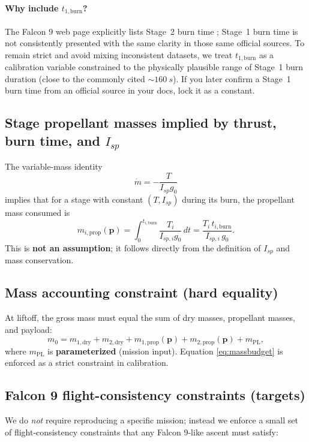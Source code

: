 \documentclass[11pt]{article}
\begin{document}
\paragraph{Why include $t_{1,\text{burn}}$?}
The Falcon 9 web page explicitly lists Stage~2 burn time \cite{SpaceX_F9_Web}; Stage~1 burn time is not consistently presented with the same clarity in those same official sources. To remain strict and avoid mixing inconsistent datasets, we treat $t_{1,\text{burn}}$ as a calibration variable constrained to the physically plausible range of Stage~1 burn duration (close to the commonly cited $\sim\SI{160}{s}$). If you later confirm a Stage~1 burn time from an official source in your docs, lock it as a constant.

\subsection{Stage propellant masses implied by thrust, burn time, and $I_{sp}$}
The variable-mass identity
\[
\dot m=-\frac{T}{I_{sp}g_0}
\]
implies that for a stage with constant $(T,I_{sp})$ during its burn, the propellant mass consumed is
\begin{equation}\label{eq:mprop}
m_{i,\text{prop}}( \bm{p} )=\int_0^{t_{i,\text{burn}}}\!\!\frac{T_i}{I_{sp,i}g_0}\,dt
=\frac{T_i\,t_{i,\text{burn}}}{I_{sp,i}\,g_0}.
\end{equation}
This is \textbf{not an assumption}; it follows directly from the definition of $I_{sp}$ and mass conservation.

\subsection{Mass accounting constraint (hard equality)}
At liftoff, the gross mass must equal the sum of dry masses, propellant masses, and payload:
\begin{equation}\label{eq:massbudget}
m_0=
m_{1,\text{dry}} + m_{2,\text{dry}}
+ m_{1,\text{prop}}(\bm{p}) + m_{2,\text{prop}}(\bm{p})
+ m_{\text{PL}},
\end{equation}
where $m_{\text{PL}}$ is \textbf{parameterized} (mission input). Equation \eqref{eq:massbudget} is enforced as a strict constraint in calibration.

\subsection{Falcon 9 flight-consistency constraints (targets)}
We do \emph{not} require reproducing a specific mission; instead we enforce a small set of flight-consistency constraints that any Falcon 9-like ascent must satisfy:
\end{document}
